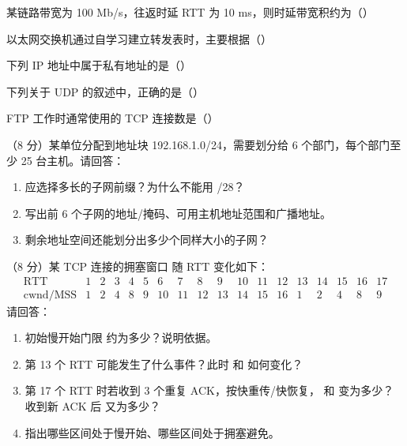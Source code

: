 \documentclass[a4paper,11pt]{article}
\begin{document}

\q 某链路带宽为 100 Mb/s，往返时延 RTT 为 10 ms，则时延带宽积约为（\quad）

\q 以太网交换机通过自学习建立转发表时，主要根据（\quad）

\q 下列 IP 地址中属于私有地址的是（\quad）

\q 下列关于 UDP 的叙述中，正确的是（\quad）

\q FTP 工作时通常使用的 TCP 连接数是（\quad）


\q （8 分）某单位分配到地址块 192.168.1.0/24，需要划分给 6 个部门，每个部门至少 25 台主机。请回答：
\begin{enumerate}[label=（\arabic*）, leftmargin=2.4em, itemsep=1pt]
  \item 应选择多长的子网前缀？为什么不能用 /28？
  \item 写出前 6 个子网的地址/掩码、可用主机地址范围和广播地址。
  \item 剩余地址空间还能划分出多少个同样大小的子网？
\end{enumerate}
\anslines{8cm}

\q （8 分）某 TCP 连接的拥塞窗口  随 RTT 变化如下：
\[
\begin{array}{c|ccccccccccccccccc}
\text{RTT} & 1&2&3&4&5&6&7&8&9&10&11&12&13&14&15&16&17\\
\hline
\text{cwnd/MSS} & 1&2&4&8&9&10&11&12&13&14&15&16&1&2&4&8&9
\end{array}
\]
请回答：
\begin{enumerate}[label=（\arabic*）, leftmargin=2.4em, itemsep=1pt]
  \item 初始慢开始门限  约为多少？说明依据。
  \item 第 13 个 RTT 可能发生了什么事件？此时  和  如何变化？
  \item 第 17 个 RTT 时若收到 3 个重复 ACK，按快重传/快恢复， 和  变为多少？收到新 ACK 后  又为多少？
  \item 指出哪些区间处于慢开始、哪些区间处于拥塞避免。
\end{enumerate}
\anslines{8cm}
\end{document}
